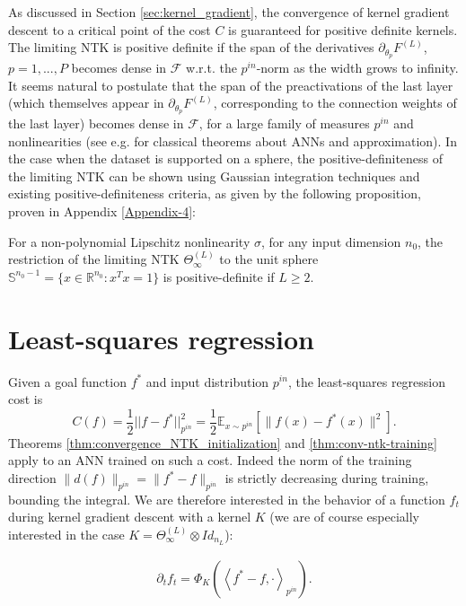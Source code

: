 As discussed in Section \ref{sec:kernel_gradient}, the convergence of kernel gradient descent to a critical point of the cost $C$ is guaranteed for positive definite kernels. The limiting NTK is positive definite if the span of the derivatives $\partial_{\theta_p} F^{(L)}$, $p=1, ..., P$ becomes dense in $\mathcal{F}$ w.r.t. the $p^{in}$-norm as the width grows to infinity. It seems natural to postulate that the span of the preactivations of the last layer (which themselves appear in $\partial_{\theta_p} F^{(L)}$, corresponding to the connection weights of the last layer) becomes dense in $\mathcal{F}$, for a large family of measures $ p^{in}$ and nonlinearities (see e.g. \cite{Hornik1989, Leshno} for classical theorems about ANNs and approximation). In the case when the dataset is supported on a sphere, the positive-definiteness of the limiting NTK can be shown using Gaussian integration techniques and existing positive-definiteness criteria, as given by the following proposition, proven in Appendix \ref{Appendix-4}:

\begin{prop}\label{prop:pos-def}
	 For a non-polynomial Lipschitz nonlinearity $ \sigma $, for any input dimension $ n_0 $, the restriction of the limiting NTK $ \Theta_\infty^{(L)} $ to the unit sphere $ \mathbb{S}^{n_0 - 1} = \{ x \in \mathbb{R}^{n_0} : x^T x =1 \} $ is positive-definite if $ L \geq 2 $. 
\end{prop}

\section{Least-squares regression}\label{sec:least-squares}
Given a goal function $f^*$ and input distribution $p^{in}$, the least-squares regression cost is $$ C(f) = \frac{1}{2} ||f - f^*||^2_{p^{in}} = \frac{1}{2}\mathbb{E}_{x \sim p^{in}} \left[\|f(x) - f^*(x)\|^2 \right].
$$
Theorems  \ref{thm:convergence_NTK_initialization} and \ref{thm:conv-ntk-training} apply to an ANN trained on such a cost. Indeed the norm of the training direction $\|d(f)\|_{p^{in}} = \| f^* - f \|_{p^{in}}$ is strictly decreasing during training, bounding the integral. We are therefore interested in the behavior of a function $f_t$ during kernel gradient descent with a kernel $K$ (we are of course especially interested in the case $K = \Theta^{(L)}_\infty \otimes Id_{n_L}$):

\begin{align*}
    \partial_t f_t = \Phi_K\left(\left<f^* - f, \cdot \right>_{p^{in}}\right).
\end{align*}

